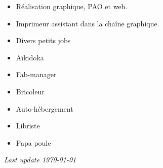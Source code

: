 \documentclass[10pt,a4paper,ragged2e,withhyper,normalphoto]{altacv}
\begin{document}
\begin{paracol}{2}
\divider

\begin{itemize}
\item Réalisation graphique, PAO et web.
\end{itemize}

\divider

\begin{itemize}
\item Imprimeur assistant dans la chaîne graphique.
\end{itemize}

\divider

\begin{itemize}
\item Divers petits jobs
\end{itemize}

\end{paracol}


\begin{paracol}{2}

\begin{itemize}
\item Aïkidoka
\item Fab-manager
\item Bricoleur
\switchcolumn
\item Auto-hébergement
\item Libriste
\item Papa poule
\end{itemize}

\end{paracol}

\bigskip

\raggedleft
{\textit{Last update \today}}
\end{document}
